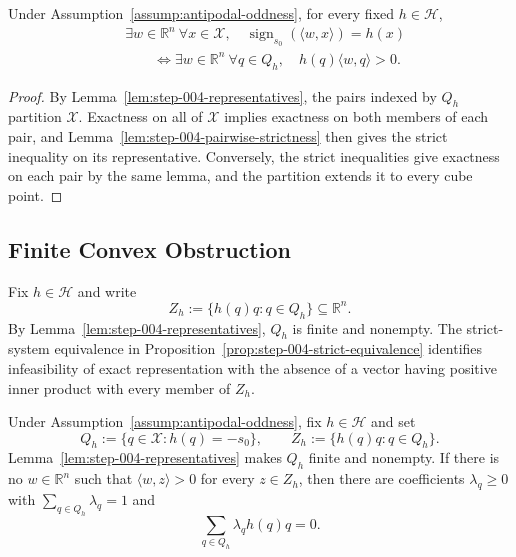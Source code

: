 \begin{proposition}
\label{prop:step-004-strict-equivalence}
Under Assumption~\ref{assump:antipodal-oddness}, for every fixed
$h\in\mathcal H$,
\[
\begin{aligned}
&\exists w\in\mathbb R^n\ \forall x\in\mathcal X,
\quad\operatorname{sign}_{s_0}(\langle w,x\rangle)=h(x)\\
&\qquad\Longleftrightarrow
\exists w\in\mathbb R^n\ \forall q\in Q_h,
\quad h(q)\langle w,q\rangle>0.
\end{aligned}
\]
\end{proposition}

\begin{proof}
By Lemma~\ref{lem:step-004-representatives}, the pairs indexed by $Q_h$
partition $\mathcal X$.  Exactness on all of $\mathcal X$ implies exactness
on both members of each pair, and Lemma~\ref{lem:step-004-pairwise-strictness}
then gives the strict inequality on its representative.  Conversely, the
strict inequalities give exactness on each pair by the same lemma, and the
partition extends it to every cube point.
\end{proof}

\subsection{Finite Convex Obstruction}
\label{app:convex-obstruction}

Fix $h\in\mathcal H$ and write
\[
 Z_h:=\{h(q)q:q\in Q_h\}\subseteq\mathbb R^n.
\]
By Lemma~\ref{lem:step-004-representatives}, $Q_h$ is finite and nonempty.
The strict-system equivalence in Proposition~\ref{prop:step-004-strict-equivalence}
identifies infeasibility of exact representation with the absence of a vector
having positive inner product with every member of $Z_h$.

\begin{proposition}
\label{prop:step-005-closest-point}
Under Assumption~\ref{assump:antipodal-oddness}, fix $h\in\mathcal H$ and set
\[
 Q_h:=\{q\in\mathcal X:h(q)=-s_0\},\qquad
 Z_h:=\{h(q)q:q\in Q_h\}.
\]
Lemma~\ref{lem:step-004-representatives} makes $Q_h$ finite and nonempty.  If
there is no $w\in\mathbb R^n$ such that
$\langle w,z\rangle>0$ for every $z\in Z_h$, then there are coefficients
$\lambda_q\geq0$ with $\sum_{q\in Q_h}\lambda_q=1$ and
\[
\sum_{q\in Q_h}\lambda_q h(q)q=0.
\]
\end{proposition}

